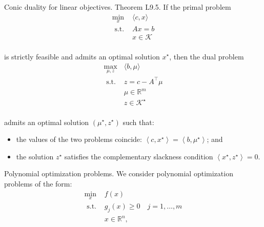 \begin{theorem}[L9.5]{Conic duality for linear objectives.}
    Theorem L9.5. If the primal problem
    \vspace{-4pt}\\
    $$
    \begin{aligned}
    \min _x & \langle c, x\rangle \\
    \text { s.t. } & A x=b \\
    & x \in \mathcal{K}
    \end{aligned}
    $$
    \vspace{-4pt}\\
    is strictly feasible and admits an optimal solution $x^{\star}$, then the dual problem
    \vspace{-4pt}\\
    $$
    \begin{array}{cl}
    \max _{\mu, z} & \langle b, \mu\rangle \\
    \text { s.t. } & z=c-A^{\top} \mu \\
    & \mu \in \mathbb{R}^m \\
    & z \in \mathcal{K}^{\star}
    \end{array}
    $$
    \vspace{-7pt}\\
    admits an optimal solution $\left(\mu^{\star}, z^{\star}\right)$ such that:
    \begin{itemize}[leftmargin=*]
        \item the values of the two problems coincide: $\left\langle c, x^{\star}\right\rangle=\left\langle b, \mu^{\star}\right\rangle$; and\vspace{-4pt}
        \item the solution $z^{\star}$ satisfies the complementary slackness condition $\left\langle x^{\star}, z^{\star}\right\rangle=0$.       
    \end{itemize}
\end{theorem}


\begin{remark}[L10.1]{Polynomial optimization problems.}
    We consider polynomial optimization problems of the form:
    \vspace{-4pt}\\
    $$
    \begin{array}{cl}
        \min _x & f(x) \\
        \text { s.t. } & g_j(x) \geq 0 \quad j=1, \ldots, m \\
        & x \in \mathbb{R}^n,
        \end{array}
    $$
    \vspace{-5pt}
\end{remark}

